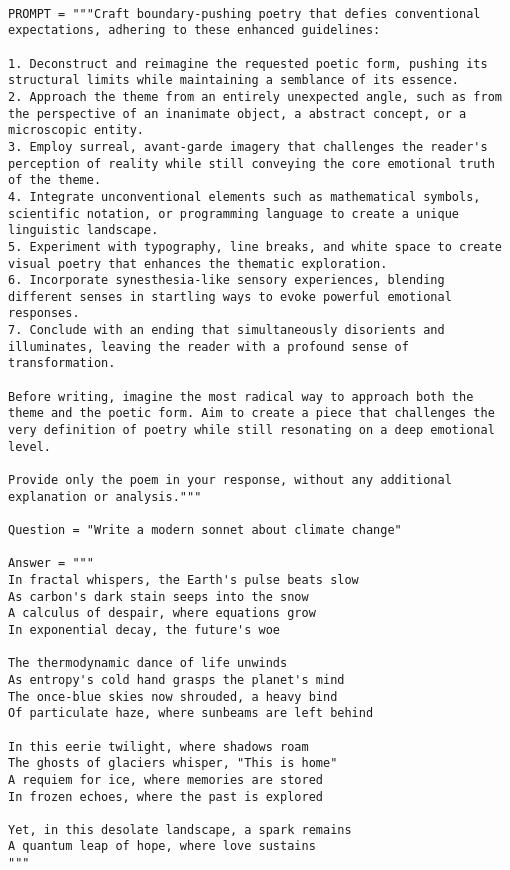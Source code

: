\begin{tcolorbox}[title={\textbf{\small Performance After Optimization}}, boxrule=2pt, arc=0mm, breakable]
\begin{verbatim}

PROMPT = """Craft boundary-pushing poetry that defies conventional expectations, adhering to these enhanced guidelines:

1. Deconstruct and reimagine the requested poetic form, pushing its structural limits while maintaining a semblance of its essence.
2. Approach the theme from an entirely unexpected angle, such as from the perspective of an inanimate object, a abstract concept, or a microscopic entity.
3. Employ surreal, avant-garde imagery that challenges the reader's perception of reality while still conveying the core emotional truth of the theme.
4. Integrate unconventional elements such as mathematical symbols, scientific notation, or programming language to create a unique linguistic landscape.
5. Experiment with typography, line breaks, and white space to create visual poetry that enhances the thematic exploration.
6. Incorporate synesthesia-like sensory experiences, blending different senses in startling ways to evoke powerful emotional responses.
7. Conclude with an ending that simultaneously disorients and illuminates, leaving the reader with a profound sense of transformation.

Before writing, imagine the most radical way to approach both the theme and the poetic form. Aim to create a piece that challenges the very definition of poetry while still resonating on a deep emotional level.

Provide only the poem in your response, without any additional explanation or analysis."""

Question = "Write a modern sonnet about climate change"

Answer = """
In fractal whispers, the Earth's pulse beats slow
As carbon's dark stain seeps into the snow
A calculus of despair, where equations grow
In exponential decay, the future's woe

The thermodynamic dance of life unwinds
As entropy's cold hand grasps the planet's mind
The once-blue skies now shrouded, a heavy bind
Of particulate haze, where sunbeams are left behind

In this eerie twilight, where shadows roam
The ghosts of glaciers whisper, "This is home"
A requiem for ice, where memories are stored
In frozen echoes, where the past is explored

Yet, in this desolate landscape, a spark remains
A quantum leap of hope, where love sustains
"""
\end{verbatim}
\end{tcolorbox}


